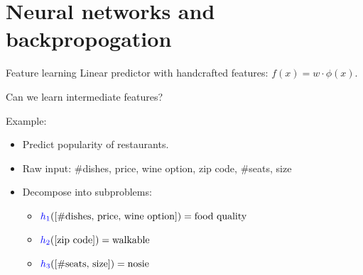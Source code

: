 \documentclass[usenames,dvipsnames,notes]{beamer}
\begin{document}
\section{Neural networks and backpropogation}

\begin{frame}
    {Feature learning}
    Linear predictor with handcrafted features: $f(x) = w\cdot\phi(x)$.

    Can we learn intermediate features?

    Example:\\
    \begin{itemize}
    \item Predict popularity of restaurants.
    \item Raw input: \#dishes, price, wine option, zip code, \#seats, size 
    \item Decompose into subproblems:
    \begin{itemize}
        \itemsep2ex
    \item[] ${\color{blue}h_1}(\left[ \text{\#dishes, price, wine option} \right]) = \text{food quality}$
    \item[] ${\color{blue}h_2}(\left[ \text{zip code} \right]) = \text{walkable}$
    \item[] ${\color{blue}h_3}(\left[ \text{\#seats, size} \right]) = \text{nosie}$
    \end{itemize}
    \end{itemize}

\end{frame}
\end{document}
